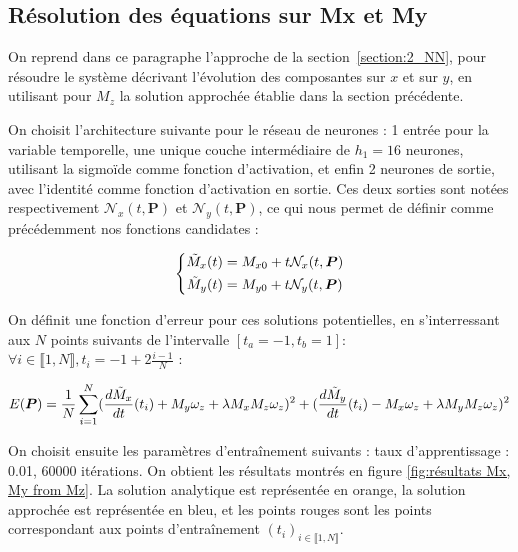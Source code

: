 \documentclass[12pt]{report}
\begin{document}
\subsection{Résolution des équations sur Mx et My}
\label{section:Mx My from Mz}

On reprend dans ce paragraphe l'approche de la section~\ref{section:2_NN}, pour résoudre le système décrivant l'évolution des composantes sur $x$ et sur $y$, en utilisant pour $M_z$ la solution approchée établie dans la section précédente.

On choisit l'architecture suivante pour le réseau de neurones : 
1 entrée pour la variable temporelle, une unique couche intermédiaire de $h_1=16$ neurones, utilisant la sigmoïde comme fonction d'activation, et enfin 2 neurones de sortie, avec l'identité comme fonction d'activation en sortie.
Ces deux sorties sont notées respectivement $\mathcal{N}_x(t, \bm{P})$ et $\mathcal{N}_y(t, \bm{P})$, ce qui nous permet de définir comme précédemment nos fonctions candidates :

\begin{equation}
    \left\{
        \begin{aligned}
            \Tilde{M}_x(t) &= M_{x0} + t\mathcal{N}_x(t, \bm{P}) \\
            \Tilde{M}_y(t) &= M_{y0} + t\mathcal{N}_y(t, \bm{P})
        \end{aligned}
    \right.
\label{eq:solution Mx_My from M_z}
\end{equation}

On définit une fonction d'erreur pour ces solutions potentielles, en s'interressant aux $N$ points suivants de l'intervalle $[t_a=-1, t_b=1]$: 
$\forall i \in\llbracket 1,N \rrbracket, t_i = -1 + 2\frac{i-1}{N} $ :

\begin{equation}
        E(\bm{P}) = \frac{1}{N}\sum_{i=1}^{N} (\frac{d\Tilde{M}_x}{dt}(t_i) + M_y\omega_z + \lambda M_x M_z \omega_z)^2 + (\frac{d\Tilde{M}_y}{dt}(t_i) -M_x\omega_z + \lambda M_y M_z \omega_z)^2
\label{eq:erreur Mx My from Mz}
\end{equation}


On choisit ensuite les paramètres d'entraînement suivants : taux d'apprentissage : 0.01, 60000 itérations.
On obtient les résultats montrés en figure \ref{fig:résultats Mx, My from Mz}.
La solution analytique est représentée en orange, la solution approchée est représentée en bleu, et les points rouges sont les points correspondant aux points d'entraînement $(t_i)_{i \in \llbracket 1, N \rrbracket}$.
\end{document}
